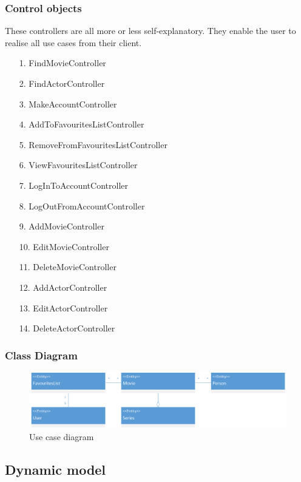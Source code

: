 \subsubsection{Control objects}

These controllers are all more or less self-explanatory. They enable the user to realise all use cases from their client.

\begin{enumerate}
	\item[1.] FindMovieController
	\item[2.] FindActorController
	\item[3.] MakeAccountController 
	\item[4.] AddToFavouritesListController
	\item[5.] RemoveFromFavouritesListController
	\item[6.] ViewFavouritesListController
	\item[7.] LogInToAccountController
	\item[8.] LogOutFromAccountController 
	
	\item[9.] AddMovieController
 	\item[10.] EditMovieController
 	\item[11.] DeleteMovieController
 	\item[12.] AddActorController
 	\item[13.] EditActorController
 	\item[14.] DeleteActorController
 	
\end{enumerate}

\subsubsection{Class Diagram}

\begin{figure}[H]
\includegraphics[width=\linewidth]{img/ClassDiagram.png}
\caption{Use case diagram}
\label{fig:use case diagram}
\end{figure}

\subsection{Dynamic model}



